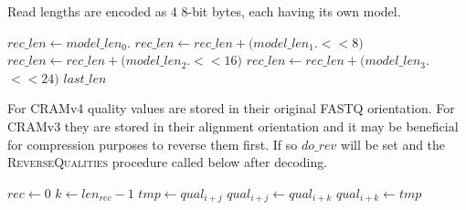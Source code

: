 \documentclass[a4paper]{article}
\begin{document}
Read lengths are encoded as 4 8-bit bytes, each having its own model.

\begin{algorithmic}[1]
\State $rec\_len \gets model\_len_0.$
\State $rec\_len \gets rec\_len + (model\_len_1.$$ << 8)$
\State $rec\_len \gets rec\_len + (model\_len_2.$$ << 16)$
\State $rec\_len \gets rec\_len + (model\_len_3.$$ << 24)$
\State \Return $last\_len$
\EndFunction
\end{algorithmic}

For CRAMv4 quality values are stored in their original FASTQ
orientation.  For CRAMv3 they are stored in their alignment
orientation and it may be beneficial for compression purposes to
reverse them first.  If so $do\_rev$ will be set and the
\textsc{ReverseQualities} procedure called below after decoding.

\begin{algorithmic}[1]
\State $rec \gets 0$
    \State $k \gets len_{rec}-1$
      \State $tmp \gets qual_{i+j}$
      \State $qual_{i+j} \gets qual_{i+k}$
      \State $qual_{i+k} \gets tmp$
    \EndFor
  \EndIf
\EndFor
\EndProcedure
\end{algorithmic}
\end{document}
